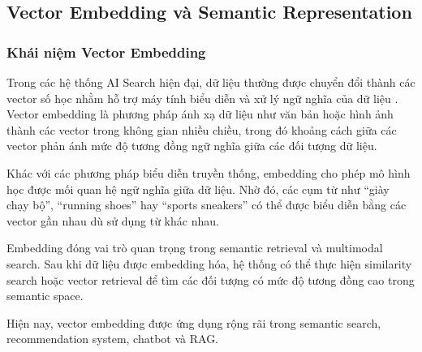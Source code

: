 


\subsection{Vector Embedding và Semantic Representation}
\subsubsection{Khái niệm Vector Embedding}

Trong các hệ thống AI Search hiện đại, dữ liệu thường được chuyển đổi thành các vector số học nhằm hỗ trợ máy tính biểu diễn và xử lý ngữ nghĩa của dữ liệu \cite{bert_paper}. Vector embedding là phương pháp ánh xạ dữ liệu như văn bản hoặc hình ảnh thành các vector trong không gian nhiều chiều, trong đó khoảng cách giữa các vector phản ánh mức độ tương đồng ngữ nghĩa giữa các đối tượng dữ liệu.

Khác với các phương pháp biểu diễn truyền thống, embedding cho phép mô hình học được mối quan hệ ngữ nghĩa giữa dữ liệu. Nhờ đó, các cụm từ như ``giày chạy bộ'', ``running shoes'' hay ``sports sneakers'' có thể được biểu diễn bằng các vector gần nhau dù sử dụng từ khác nhau.

Embedding đóng vai trò quan trọng trong semantic retrieval và multimodal search. Sau khi dữ liệu được embedding hóa, hệ thống có thể thực hiện similarity search hoặc vector retrieval để tìm các đối tượng có mức độ tương đồng cao trong semantic space.

Hiện nay, vector embedding được ứng dụng rộng rãi trong semantic search, recommendation system, chatbot và RAG.
